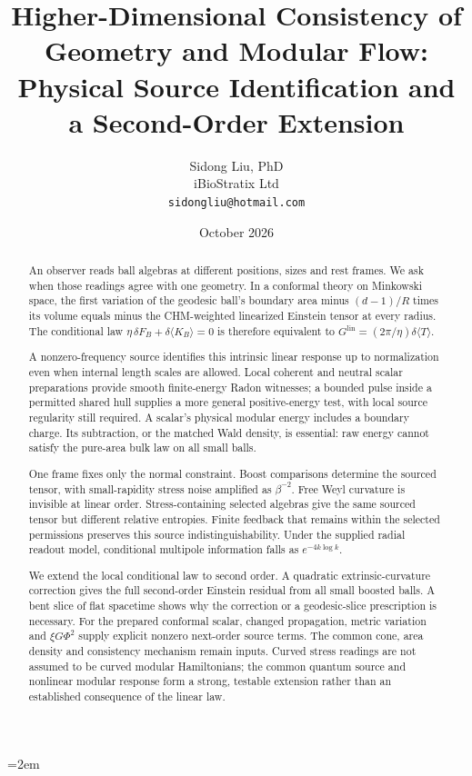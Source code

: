 \documentclass[12pt]{article}
\title{%
  \textbf{Higher-Dimensional Consistency of Geometry and Modular Flow:}\\
  \textbf{Physical Source Identification and a Second-Order Extension}%
}
\author{
  Sidong Liu, PhD \\
  \small iBioStratix Ltd \\
  \small \texttt{sidongliu@hotmail.com}
}
\date{October 2026}
\theoremstyle{definition}
\theoremstyle{remark}
\begin{document}
\emergencystretch=2em
\raggedbottom
{}

\maketitle

\begin{abstract}
An observer reads ball algebras at different positions, sizes and rest
frames. We ask when those readings agree with one geometry. In a conformal
theory on Minkowski space, the first variation of the geodesic ball's
boundary area minus $(d-1)/R$ times its volume equals minus the
CHM-weighted linearized Einstein tensor at every radius. The conditional
law $\eta\,\delta F_B+\delta\langle K_B\rangle=0$ is therefore equivalent
to $G^{\mathrm{lin}}=(2\pi/\eta)\delta\langle T\rangle$.

A nonzero-frequency source identifies this intrinsic linear response up
to normalization even when internal length scales are allowed. Local
coherent and neutral scalar preparations provide smooth finite-energy
Radon witnesses; a bounded pulse inside a permitted shared hull supplies
a more general positive-energy test, with local source regularity still
required. A scalar's physical modular energy includes a boundary charge.
Its subtraction, or the matched Wald density, is essential: raw energy
cannot satisfy the pure-area bulk law on all small balls.

One frame fixes only the normal constraint. Boost comparisons determine
the sourced tensor, with small-rapidity stress noise amplified as
$\beta^{-2}$. Free Weyl curvature is invisible at linear order.
Stress-containing selected algebras give the same sourced tensor but
different relative entropies. Finite feedback that remains within the
selected permissions preserves this source indistinguishability. Under the supplied radial readout model,
conditional multipole information falls as $e^{-4k\log k}$.

We extend the local conditional law to second order. A quadratic
extrinsic-curvature correction gives the full second-order Einstein
residual from all small boosted balls. A bent slice of flat spacetime
shows why the correction or a geodesic-slice prescription is necessary.
For the prepared conformal scalar, changed propagation, metric variation
and $\xi G\Phi^2$ supply explicit nonzero next-order source terms.
The common cone, area density and consistency mechanism remain inputs.
Curved stress readings are not assumed to be curved modular Hamiltonians;
the common quantum source and nonlinear modular response form a strong,
testable extension rather than an established consequence of the linear law.
\end{abstract}
\end{document}
